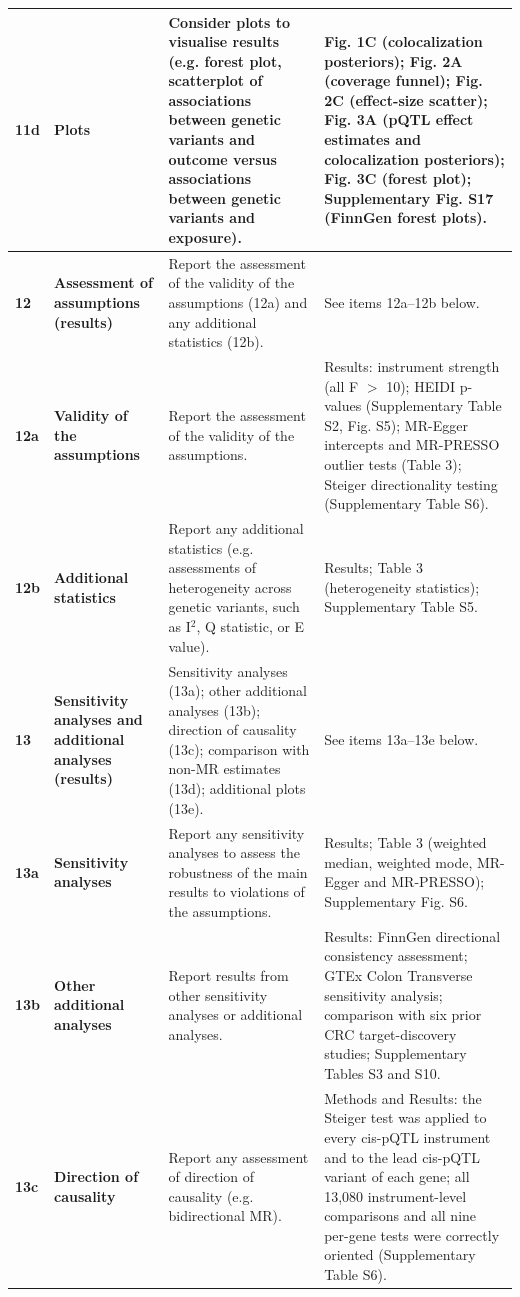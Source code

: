 \documentclass[10pt,a4paper]{article}
\begin{document}
\begin{longtable}{@{}p{7mm}p{32mm}p{52mm}p{68mm}@{}}
\midrule
\textbf{11d} & \textbf{Plots} & Consider plots to visualise results (e.g. forest plot, scatterplot of associations between genetic variants and outcome versus associations between genetic variants and exposure). & Fig. 1C (colocalization posteriors); Fig. 2A (coverage funnel); Fig. 2C (effect-size scatter); Fig. 3A (pQTL effect estimates and colocalization posteriors); Fig. 3C (forest plot); Supplementary Fig. S17 (FinnGen forest plots). \\
\midrule
\textbf{12} & \textbf{Assessment of assumptions (results)} & Report the assessment of the validity of the assumptions (12a) and any additional statistics (12b). & See items 12a--12b below. \\
\midrule
\textbf{12a} & \textbf{Validity of the assumptions} & Report the assessment of the validity of the assumptions. & Results: instrument strength (all F $>$ 10); HEIDI p-values (Supplementary Table S2, Fig. S5); MR-Egger intercepts and MR-PRESSO outlier tests (Table 3); Steiger directionality testing (Supplementary Table S6). \\
\midrule
\textbf{12b} & \textbf{Additional statistics} & Report any additional statistics (e.g. assessments of heterogeneity across genetic variants, such as I$^{2}$, Q statistic, or E value). & Results; Table 3 (heterogeneity statistics); Supplementary Table S5. \\
\midrule
\textbf{13} & \textbf{Sensitivity analyses and additional analyses (results)} & Sensitivity analyses (13a); other additional analyses (13b); direction of causality (13c); comparison with non-MR estimates (13d); additional plots (13e). & See items 13a--13e below. \\
\midrule
\textbf{13a} & \textbf{Sensitivity analyses} & Report any sensitivity analyses to assess the robustness of the main results to violations of the assumptions. & Results; Table 3 (weighted median, weighted mode, MR-Egger and MR-PRESSO); Supplementary Fig. S6. \\
\midrule
\textbf{13b} & \textbf{Other additional analyses} & Report results from other sensitivity analyses or additional analyses. & Results: FinnGen directional consistency assessment; GTEx Colon Transverse sensitivity analysis; comparison with six prior CRC target-discovery studies; Supplementary Tables S3 and S10. \\
\midrule
\textbf{13c} & \textbf{Direction of causality} & Report any assessment of direction of causality (e.g. bidirectional MR). & Methods and Results: the Steiger test was applied to every cis-pQTL instrument and to the lead cis-pQTL variant of each gene; all 13,080 instrument-level comparisons and all nine per-gene tests were correctly oriented (Supplementary Table S6). \\

\end{longtable}
\end{document}
